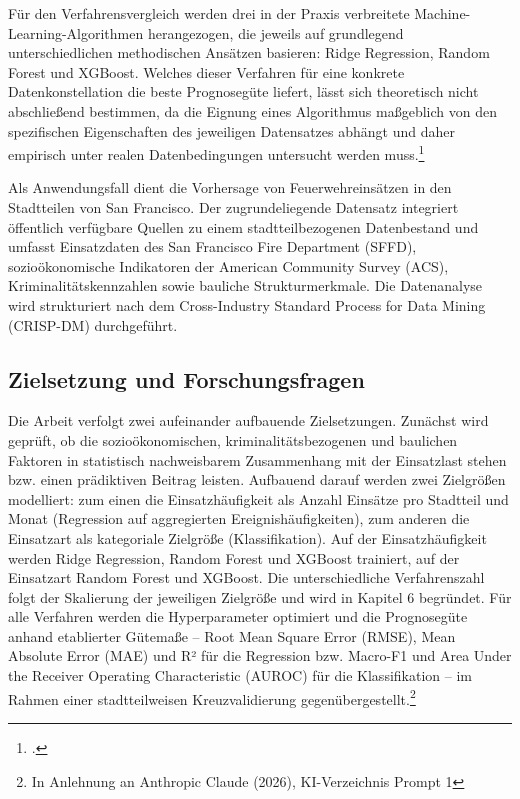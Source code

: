 \documentclass[12pt,a4paper]{article}
\begin{document}

Für den Verfahrensvergleich werden drei in der Praxis verbreitete Machine-Learning-Algorithmen
herangezogen, die jeweils auf grundlegend unterschiedlichen methodischen Ansätzen basieren:
Ridge Regression, Random Forest und XGBoost. Welches dieser Verfahren für eine konkrete
Datenkonstellation die beste Prognosegüte liefert, lässt sich theoretisch nicht abschließend
bestimmen, da die Eignung eines Algorithmus maßgeblich von den spezifischen Eigenschaften des
jeweiligen Datensatzes abhängt und daher empirisch unter realen Datenbedingungen untersucht
werden muss.\footcite[3133, 3175]{FernandezDelgado2014}

Als Anwendungsfall dient die Vorhersage von Feuerwehreinsätzen in den Stadtteilen von
San Francisco. Der zugrundeliegende Datensatz integriert öffentlich verfügbare Quellen zu einem
stadtteilbezogenen Datenbestand und umfasst Einsatzdaten des San Francisco Fire Department
(SFFD), sozioökonomische Indikatoren der American Community Survey (ACS), Kriminalitätskennzahlen
sowie bauliche Strukturmerkmale. Die Datenanalyse wird strukturiert nach dem Cross-Industry
Standard Process for Data Mining (CRISP-DM) durchgeführt.

\subsection{Zielsetzung und Forschungsfragen}


Die Arbeit verfolgt zwei aufeinander aufbauende Zielsetzungen. Zunächst wird geprüft, ob die
sozioökonomischen, kriminalitätsbezogenen und baulichen Faktoren in statistisch nachweisbarem
Zusammenhang mit der Einsatzlast stehen bzw. einen prädiktiven Beitrag leisten. Aufbauend darauf
werden zwei Zielgrößen modelliert: zum einen die Einsatzhäufigkeit als Anzahl Einsätze pro
Stadtteil und Monat (Regression auf aggregierten Ereignishäufigkeiten), zum anderen die Einsatzart
als kategoriale Zielgröße (Klassifikation). Auf der Einsatzhäufigkeit werden Ridge Regression,
Random Forest und XGBoost trainiert, auf der Einsatzart Random Forest und XGBoost. Die
unterschiedliche Verfahrenszahl folgt der Skalierung der jeweiligen Zielgröße und wird in
Kapitel 6 begründet. Für alle Verfahren werden die Hyperparameter optimiert und die
Prognosegüte anhand etablierter Gütemaße -- Root Mean Square Error (RMSE), Mean Absolute
Error (MAE) und R² für die Regression bzw. Macro-F1 und Area Under the Receiver Operating
Characteristic (AUROC) für die Klassifikation -- im Rahmen einer stadtteilweisen
Kreuzvalidierung gegenübergestellt.\footnote{In
Anlehnung an Anthropic Claude (2026), KI-Verzeichnis Prompt 1}
\end{document}
